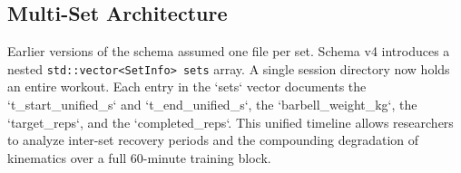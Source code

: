 \subsection{Multi-Set Architecture}
Earlier versions of the schema assumed one file per set. Schema v4 introduces a nested \texttt{std::vector<SetInfo> sets} array. A single session directory now holds an entire workout. Each entry in the `sets` vector documents the `t_start_unified_s` and `t_end_unified_s`, the `barbell_weight_kg`, the `target_reps`, and the `completed_reps`. This unified timeline allows researchers to analyze inter-set recovery periods and the compounding degradation of kinematics over a full 60-minute training block.
